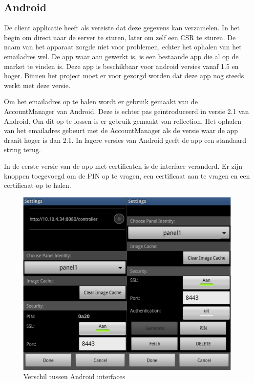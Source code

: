 \documentclass[]{article}
\begin{document}
\subsection{Android}
De client applicatie heeft als vereiste dat deze gegevens kan verzamelen. In het
begin om direct naar de server te sturen, later om zelf een CSR te sturen. De
naam van het apparaat zorgde niet voor problemen, echter het ophalen van het
emailadres wel. De app waar aan gewerkt is, is een bestaande app die al op de
market te vinden is. Deze app is beschikbaar voor android versies vanaf 1.5 en
hoger. Binnen het project moet er voor gezorgd worden dat deze app nog steeds
werkt met deze versie.

Om het emailadres op te halen wordt er gebruik gemaakt van de AccountManager van
Android. Deze is echter pas ge\"introduceerd in versie 2.1 van Android. Om dit
op te lossen is er gebruik gemaakt van reflection. Het ophalen van het
emailadres gebeurt met de AccountManager als de versie waar de app draait hoger
is dan 2.1. In lagere versies van Android geeft de app een standaard string
terug.

In de eerste versie van de app met certificaten is de interface veranderd. Er
zijn knoppen toegevoegd om de PIN op te vragen, een certificaat aan te vragen en
een certificaat op te halen.

\begin{figure}[htpb]
   \begin{center}
     \includegraphics[height=0.4\textheight]{device-android.pdf}
   \end{center}
   \caption{Verschil tussen Android interfaces}
   \label{androidv2}
\end{figure}
\end{document}
